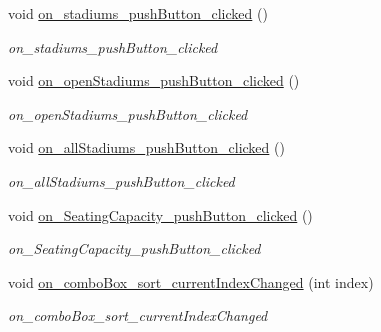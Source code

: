 \begin{DoxyCompactItemize}
\mbox{\label{class_main_window_a3276a36746b8bb252dc094611260f2b9}} 
void \hyperlink{class_main_window_a3276a36746b8bb252dc094611260f2b9}{on\+\_\+stadiums\+\_\+push\+Button\+\_\+clicked} ()
\begin{DoxyCompactList}\small\item\em on\+\_\+stadiums\+\_\+push\+Button\+\_\+clicked \end{DoxyCompactList}\item 
\mbox{\label{class_main_window_a6054f218f8b73bf0b62a955f80d2967a}} 
void \hyperlink{class_main_window_a6054f218f8b73bf0b62a955f80d2967a}{on\+\_\+open\+Stadiums\+\_\+push\+Button\+\_\+clicked} ()
\begin{DoxyCompactList}\small\item\em on\+\_\+open\+Stadiums\+\_\+push\+Button\+\_\+clicked \end{DoxyCompactList}\item 
\mbox{\label{class_main_window_a7ad5ee2168533908c606ac57991c509d}} 
void \hyperlink{class_main_window_a7ad5ee2168533908c606ac57991c509d}{on\+\_\+all\+Stadiums\+\_\+push\+Button\+\_\+clicked} ()
\begin{DoxyCompactList}\small\item\em on\+\_\+all\+Stadiums\+\_\+push\+Button\+\_\+clicked \end{DoxyCompactList}\item 
\mbox{\label{class_main_window_af8962eb239be5f73b8c80919e33ffc49}} 
void \hyperlink{class_main_window_af8962eb239be5f73b8c80919e33ffc49}{on\+\_\+\+Seating\+Capacity\+\_\+push\+Button\+\_\+clicked} ()
\begin{DoxyCompactList}\small\item\em on\+\_\+\+Seating\+Capacity\+\_\+push\+Button\+\_\+clicked \end{DoxyCompactList}\item 
void \hyperlink{class_main_window_a5cb485ec5d3aedd99a66194183e87be2}{on\+\_\+combo\+Box\+\_\+sort\+\_\+current\+Index\+Changed} (int index)
\begin{DoxyCompactList}\small\item\em on\+\_\+combo\+Box\+\_\+sort\+\_\+current\+Index\+Changed \end{DoxyCompactList}\item 
\mbox{\label{class_main_window_affc3e167fce5e44e0ec8326ae6f5edfd}} 

\end{DoxyCompactItemize}
